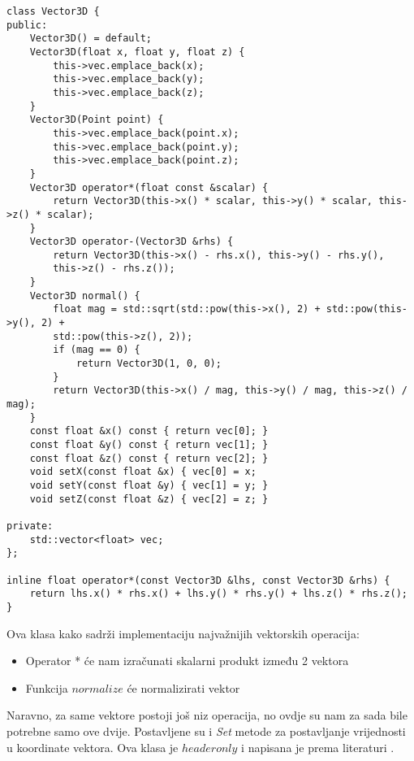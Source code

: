 \begin{lstlisting}[style = myC++, label = {code:9}, caption={Implementacija klase Vector3D}]
class Vector3D {
public:
	Vector3D() = default;
	Vector3D(float x, float y, float z) {
		this->vec.emplace_back(x);
		this->vec.emplace_back(y);
		this->vec.emplace_back(z);
	}
	Vector3D(Point point) {
		this->vec.emplace_back(point.x);
		this->vec.emplace_back(point.y);
		this->vec.emplace_back(point.z);
	}
	Vector3D operator*(float const &scalar) {
		return Vector3D(this->x() * scalar, this->y() * scalar, this->z() * scalar);
	}
	Vector3D operator-(Vector3D &rhs) {
		return Vector3D(this->x() - rhs.x(), this->y() - rhs.y(),
		this->z() - rhs.z());
	}
	Vector3D normal() {
		float mag = std::sqrt(std::pow(this->x(), 2) + std::pow(this->y(), 2) +
		std::pow(this->z(), 2));
		if (mag == 0) {
			return Vector3D(1, 0, 0);
		}
		return Vector3D(this->x() / mag, this->y() / mag, this->z() / mag);
	}
	const float &x() const { return vec[0]; }
	const float &y() const { return vec[1]; }
	const float &z() const { return vec[2]; }
	void setX(const float &x) { vec[0] = x; 
	void setY(const float &y) { vec[1] = y; }
	void setZ(const float &z) { vec[2] = z; }

private:
	std::vector<float> vec;
};

inline float operator*(const Vector3D &lhs, const Vector3D &rhs) {
	return lhs.x() * rhs.x() + lhs.y() * rhs.y() + lhs.z() * rhs.z();
}

\end{lstlisting}
Ova klasa kako sadrži implementaciju najvažnijih vektorskih operacija:
\begin{itemize}
	\item Operator * će nam izračunati skalarni produkt između 2 vektora
	\item Funkcija $normalize$ će normalizirati vektor
\end{itemize}
Naravno, za same vektore postoji još niz operacija, no ovdje su nam za sada bile potrebne samo ove dvije. Postavljene su i \emph{Set} metode za postavljanje vrijednosti u koordinate vektora. Ova klasa je $header only$ i napisana je prema literaturi \cite{2}.

